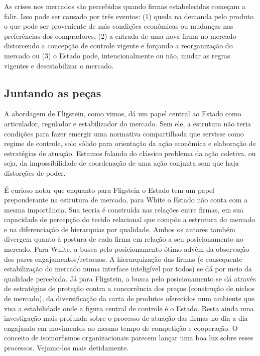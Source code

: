 \documentclass[a4paper, 12pt, openright, oneside, german, french, english, brazil]{abntex2}
\begin{document}
	As crises nos mercados são percebidas quando firmas estabelecidas começam a falir. Isso pode ser causado por três eventos: (1) queda na demanda pelo produto o que pode ser proveniente de más condições econômicas ou mudanças nas preferências dos compradores, (2) a entrada de uma nova firma no mercado distorcendo a concepção de controle vigente e forçando a reorganização do mercado ou (3) o Estado pode, intencionalmente ou não, mudar as regras vigentes e desestabilizar o mercado. 
	
	\subsection{Juntando as peças}
	
	A abordagem de Fligstein, como vimos, dá um papel central ao Estado como articulador, regulador e estabilizador do mercado. Sem ele, a estrutura não teria condições para fazer emergir uma normativa compartilhada que servisse como regime de controle, solo sólido para orientação da ação econômica e elaboração de estratégias de atuação. Estamos falando do clássico problema da ação coletiva, ou seja, da impossibilidade de coordenação de uma ação conjunta sem que haja distorções de poder.
	
	É curioso notar que enquanto para Fligstein o Estado tem um papel preponderante na estrutura de mercado, para White o Estado não conta com a mesma importância. Sua teoria é construída nas relações entre firmas, em sua capacidade de percepção do tecido relacional que compõe a estrutura do mercado e na diferenciação de hierarquias por qualidade. Ambos os autores também divergem quanto à postura de cada firma em relação a seu posicionamento no mercado. Para White, a busca pelo posicionamento ótimo advém da observação dos pares engajamentos/retornos. A hierarquização das firmas (e consequente estabilização do mercado numa interface inteligível por todos) se dá por meio da qualidade percebida. Já para Fligstein, a busca pelo posicionamento se dá através de estratégias de proteção contra a concorrência dos preços (construção de nichos de mercado), da diversificação da carta de produtos oferecidos num ambiente que visa a estabilidade onde a figura central de controle é o Estado. Resta ainda uma investigação mais profunda sobre o processo de atuação das firmas no dia a dia engajando em movimentos ao mesmo tempo de competição e cooperação. O conceito de isomorfismos organizacionais parecem lançar uma boa luz sobre esses processos. Vejamo-los mais detidamente.
	
\end{document}
